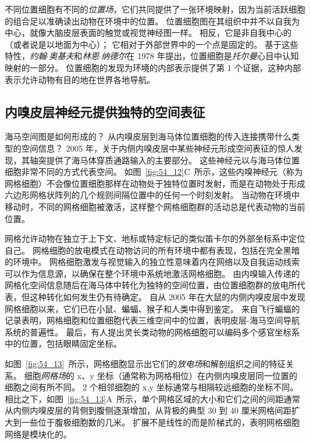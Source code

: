 不同位置细胞有不同的\textit{位置场}，它们共同提供了一张环境映射，因为当前活跃细胞的组合足以准确读出动物在环境中的位置。
位置细胞图在其组织中并不以自我为中心，就像大脑皮层表面的触觉或视觉神经图一样。
相反，它是非自我中心的（或者说是以地面为中心）；
它相对于外部世界中的一个点是固定的。
基于这些特性，\textit{约翰$\cdot$奥基夫}和\textit{林恩$\cdot$纳德尔}在 1978 年提出，位置细胞是\textit{托尔曼}心目中认知映射的一部分。
位置细胞的发现为环境的内部表示提供了第 1 个证据，这种内部表示允许动物有目的地在世界各地导航。



\subsection{内嗅皮层神经元提供独特的空间表征}

海马空间图是如何形成的？
从内嗅皮层到海马体位置细胞的传入连接携带什么类型的空间信息？
2005 年，关于内侧内嗅皮层中某些神经元形成空间表征的惊人发现，其轴突提供了海马体穿质通路输入的主要部分。
这些神经元以与海马体位置细胞非常不同的方式代表空间。
如图~\ref{fig:54_12}C~所示，这些内嗅神经元（称为网格细胞）不会像位置细胞那样在动物处于独特位置时发射，而是在动物处于形成六边形网格状阵列的几个规则间隔位置中的任何一个时刻发射。
当动物在环境中移动时，不同的网格细胞被激活，这样整个网格细胞群的活动总是代表动物的当前位置。


网格允许动物在独立于上下文、地标或特定标记的类似笛卡尔的外部坐标系中定位自己。
网格细胞的放电模式在动物访问的所有环境中都有表现，包括在完全黑暗的环境中。
网格细胞激发与视觉输入的独立性意味着内在网络以及自我运动线索可以作为信息源，以确保在整个环境中系统地激活网格细胞。
由内嗅输入传递的网格化空间信息随后在海马体中转化为独特的空间位置，由位置细胞群的放电所代表，但这种转化如何发生仍有待确定。
自从 2005 年在大鼠的内侧内嗅皮层中发现网格细胞以来，它们已在小鼠、蝙蝠、猴子和人类中得到鉴定。
来自飞行蝙蝠的记录表明，网格细胞和位置细胞代表三维空间中的位置，表明皮层-海马空间导航系统的普遍性。
最后，有人提出灵长类动物的网格细胞可以编码多个感官坐标系中的位置，包括眼睛固定坐标。


如图~\ref{fig:54_13}~所示，网格细胞显示出它们的\textit{放电场}和解剖组织之间的特征关系。
细胞\textit{网格场}的 x、y 坐标（通常称为网格相位）在内侧内嗅皮层同一位置的细胞之间有所不同。
2 个相邻细胞的 x,y 坐标通常与相隔较远细胞的坐标不同。
相比之下，如图~\ref{fig:54_13}A~所示，单个网格区域的大小和它们之间的间距通常从内侧内嗅皮层的背侧到腹侧逐渐增加，从背极的典型 30 到 40 厘米网格间距扩大到一些位于腹极细胞数的几米。
扩展不是线性的而是阶梯式的，表明网格细胞网络是模块化的。


